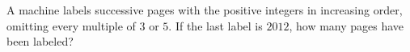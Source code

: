 A machine labels successive pages with the positive integers in increasing order, omitting every multiple of $3$ or $5$. If the last label is $2012$, how many pages have been labeled?
